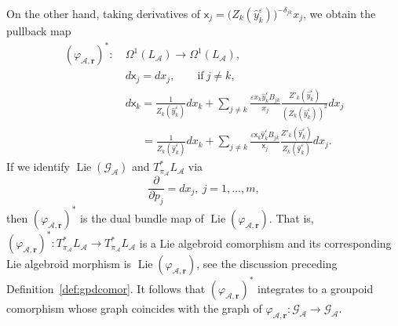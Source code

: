 \documentclass{amsart}
\numberwithin{equation}{section}
\newcommand{\bfr}{{\boldsymbol{r}}}
\newcommand{\sfx}{{\mathsf{x}}}
\newcommand{\sfy}{{\mathsf{y}}}
\newcommand{\cA}{\mathcal{A}}
\newcommand{\cG}{\mathcal{G}}
\newcommand{\Lie}{\operatorname{Lie}}
\begin{document}
On the other hand, taking derivatives of $\sfx_j = \big(Z_k(\hat{y}_k^\varepsilon)\big)^{-\delta_{jk}}x_j$,
we obtain the pullback map
\begin{align*}
	(\varphi_{\cA,\bfr})^*: ~& \Omega^1(L_\cA) \to \Omega^1(L_\cA), \\
	& d \sfx_j = dx_j, \qquad \text{if}~j\ne k, \\
	& d \sfx_k = \frac{1}{Z_k(\hat{y}_k^\varepsilon)} dx_k + \sum\limits_{j\ne k} \frac{\varepsilon x_k \hat{y}_k^\varepsilon B_{jk}}{x_j} \frac{Z'_k(\hat{y}_k^\varepsilon)}{\left(Z_k(\hat{y}_k^\varepsilon)\right)^2} dx_j \\
	& \quad \; \, = \frac{1}{Z_k(\hat{\sfy}_k^\varepsilon)} dx_k + \sum\limits_{j\ne k} \frac{\varepsilon \sfx_k \hat{\sfy}_k^\varepsilon B_{jk}}{\sfx_j} \frac{Z'_k(\hat{\sfy}_k^\varepsilon)}{Z_k(\hat{\sfy}_k^\varepsilon)} dx_j.
\end{align*}
If we identify $\Lie \left(\cG_\cA \right)$ and $T^*_{\pi_\cA} L_\cA$ via
\[
	\frac{\partial}{\partial p_j} = dx_j, \> j =1, \ldots, m,
\]
then $(\varphi_{\cA,\bfr})^*$ is the dual bundle map of $\Lie \left(\varphi_{\cA,\bfr} \right)$.
That is, $(\varphi_{\cA,\bfr})^*: T^*_{\pi_\cA} L_\cA \to T^*_{\pi_\cA} L_\cA$ is a Lie algebroid comorphism and its corresponding Lie algebroid morphism is $\Lie \left(\varphi_{\cA,\bfr} \right)$, see the discussion preceding Definition~\ref{def:gpdcomor}.
It follows that $(\varphi_{\cA,\bfr})^*$ integrates to a groupoid comorphism whose graph coincides with the graph of $\varphi_{\cA,\bfr}: \cG_\cA \to \cG_\cA$.
\end{document}
